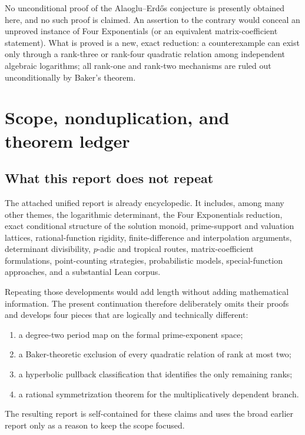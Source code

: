\documentclass[11pt]{article}
\theoremstyle{definition}
\theoremstyle{remark}
\begin{document}
\begin{auditbox}
No unconditional proof of the Alaoglu--Erd\H{o}s conjecture is presently obtained here, and
no such proof is claimed.  An assertion to the contrary would conceal an unproved instance
of Four Exponentials (or an equivalent matrix-coefficient statement).  What is proved is a
new, exact reduction: a counterexample can exist only through a rank-three or rank-four
quadratic relation among independent algebraic logarithms; all rank-one and rank-two
mechanisms are ruled out unconditionally by Baker's theorem.
\end{auditbox}

\tableofcontents
\newpage

\section{Scope, nonduplication, and theorem ledger}
\label{sec:scope}

\subsection{What this report does not repeat}

The attached unified report is already encyclopedic.  It includes, among many other themes,
the logarithmic determinant, the Four Exponentials reduction, exact conditional structure of
the solution monoid, prime-support and valuation lattices, rational-function rigidity,
finite-difference and interpolation arguments, determinant divisibility, $p$-adic and
tropical routes, matrix-coefficient formulations, point-counting strategies, probabilistic
models, special-function approaches, and a substantial Lean corpus.

Repeating those developments would add length without adding mathematical information.  The
present continuation therefore deliberately omits their proofs and develops four pieces that
are logically and technically different:
\begin{enumerate}[label=\textup{(\roman*)}]
\item a degree-two period map on the formal prime-exponent space;
\item a Baker-theoretic exclusion of every quadratic relation of rank at most two;
\item a hyperbolic pullback classification that identifies the only remaining ranks;
\item a rational symmetrization theorem for the multiplicatively dependent branch.
\end{enumerate}
The resulting report is self-contained for these claims and uses the broad earlier report
only as a reason to keep the scope focused.
\end{document}
